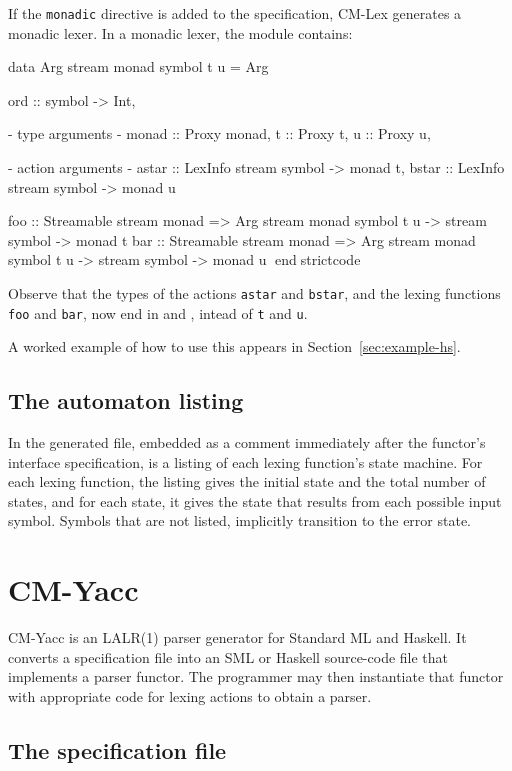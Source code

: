 \documentclass[10pt]{article}
\begin{document}
\begin{strictcode}
\begin{strictcode}
\begin{strictcode}
\begin{strictcode}
\begin{strictcode}
\begin{strictcode}
If the {\tt monadic} directive is added to the specification, CM-Lex
generates a monadic lexer.  In a monadic lexer, the module contains:

\begin{strictcode}
data Arg stream monad symbol t u =
   Arg { ord :: symbol -> Int,

         {- type arguments -}
         monad :: Proxy monad,
         t :: Proxy t,
         u :: Proxy u,

         {- action arguments -}
         astar :: LexInfo stream symbol -> monad t,
         bstar :: LexInfo stream symbol -> monad u }

foo :: Streamable stream monad
       => Arg stream monad symbol t u -> stream symbol -> monad t
bar :: Streamable stream monad
       => Arg stream monad symbol t u -> stream symbol -> monad u
endstrictcode

Observe that the types of the actions {\tt astar} and {\tt bstar}, and
the lexing functions {\tt foo} and {\tt bar}, now end in  and , intead of {\tt t} and {\tt u}.

A worked example of how to use this appears in Section~\ref{sec:example-hs}.


\subsection{The automaton listing}

In the generated file, embedded as a comment immediately after the
functor's interface specification, is a listing of each lexing
function's state machine.  For each lexing function, the listing gives
the initial state and the total number of states, and for each state,
it gives the state that results from each possible input symbol.
Symbols that are not listed, implicitly transition to the error
state.



\section{CM-Yacc}

CM-Yacc is an LALR(1) parser generator for Standard ML and Haskell.
It converts a specification file into an SML or Haskell source-code
file that implements a parser functor.  The programmer may then
instantiate that functor with appropriate code for lexing actions to
obtain a parser.


\subsection{The specification file}


\end{strictcode}
\end{strictcode}
\end{strictcode}
\end{strictcode}
\end{strictcode}
\end{strictcode}
\end{strictcode}
\end{document}
